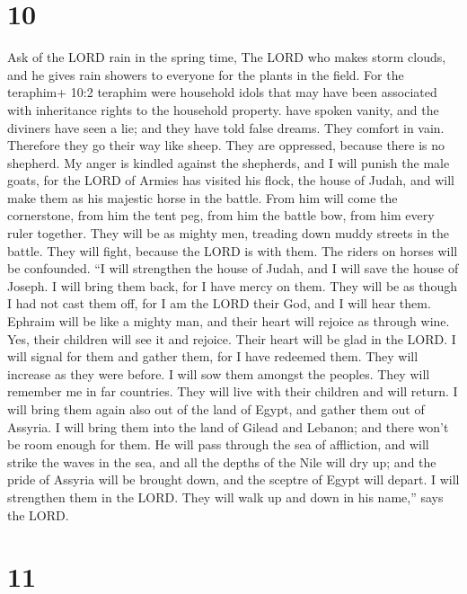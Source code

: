 \hypertarget{section-9}{%
\section{10}\label{section-9}}

 Ask of the LORD rain in the spring time, The LORD who makes
storm clouds, and he gives rain showers to everyone for the plants in
the field.  For the teraphim+ 10:2 teraphim were household
idols that may have been associated with inheritance rights to the
household property. have spoken vanity, and the diviners have seen a
lie; and they have told false dreams. They comfort in vain. Therefore
they go their way like sheep. They are oppressed, because there is no
shepherd.  My anger is kindled against the shepherds, and I
will punish the male goats, for the LORD of Armies has visited his
flock, the house of Judah, and will make them as his majestic horse in
the battle.  From him will come the cornerstone, from him
the tent peg, from him the battle bow, from him every ruler together.
 They will be as mighty men, treading down muddy streets in
the battle. They will fight, because the LORD is with them. The riders
on horses will be confounded.  ``I will strengthen the house
of Judah, and I will save the house of Joseph. I will bring them back,
for I have mercy on them. They will be as though I had not cast them
off, for I am the LORD their God, and I will hear them. 
Ephraim will be like a mighty man, and their heart will rejoice as
through wine. Yes, their children will see it and rejoice. Their heart
will be glad in the LORD.  I will signal for them and gather
them, for I have redeemed them. They will increase as they were before.
 I will sow them amongst the peoples. They will remember me
in far countries. They will live with their children and will return.
 I will bring them again also out of the land of Egypt, and
gather them out of Assyria. I will bring them into the land of Gilead
and Lebanon; and there won't be room enough for them.  He
will pass through the sea of affliction, and will strike the waves in
the sea, and all the depths of the Nile will dry up; and the pride of
Assyria will be brought down, and the sceptre of Egypt will depart.
 I will strengthen them in the LORD. They will walk up and
down in his name,'' says the LORD.

\hypertarget{section-10}{%
\section{11}\label{section-10}}


